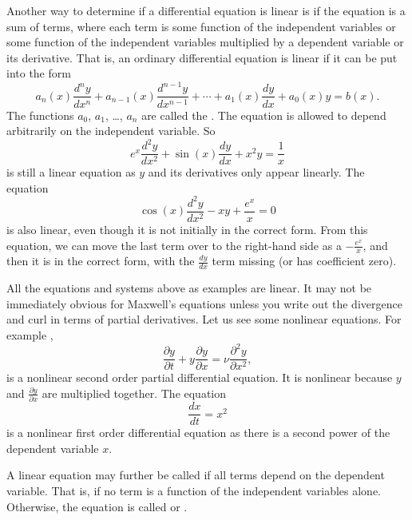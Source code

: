 Another way to determine if a differential equation is linear is if the equation is a sum of terms,
where each term is
some function of the independent variables
or 
some function of the independent variables
multiplied by a dependent variable
or its derivative. That is,
an ordinary differential equation is linear if it can be
put into the form
\begin{equation} \label{classification:eqlingen}
a_n(x) \frac{d^n y}{dx^n} + 
a_{n-1}(x) \frac{d^{n-1} y}{dx^{n-1}} + 
\cdots
+
a_{1}(x) \frac{dy}{dx}
+
a_{0}(x) y = b(x) .
\end{equation}
The functions $a_0$, $a_1$, \ldots, $a_n$ are called the
\emph{}.
The equation is allowed to depend arbitrarily on the independent variable.
So 
\begin{equation} \label{classification:eqlinex}
e^x \frac{d^2 y}{dx^2} + 
\sin(x) \frac{d y}{dx} + 
x^2 y
=
\frac{1}{x}
\end{equation}
is still a linear equation as $y$ and its derivatives only appear linearly. The equation
\[ \cos(x) \frac{d^2y}{dx^2} - xy + \frac{e^x}{x} = 0 \] is also linear, even though it
is not initially in the correct form. From this equation, we can move the last term over to the right-hand
side as a $-\frac{e^x}{x}$, and then it is in the correct form, with the $\frac{dy}{dx}$ term missing (or has coefficient zero).

All the equations and systems above as examples are linear.  
It may not be immediately obvious for Maxwell's equations unless you write out
the divergence and curl in terms of partial derivatives.  Let us see some
nonlinear equations.  For example ,
\begin{equation*}
\frac{\partial y}{\partial t} + 
y \frac{\partial y}{\partial x} =
\nu \frac{\partial^2 y}{\partial x^2} ,
\end{equation*}
is a nonlinear second order partial differential equation.  It is nonlinear
because $y$ and $\frac{\partial y}{\partial x}$ are multiplied together.
The equation
\begin{equation} \label{classification:eqnonlinode}
\frac{dx}{dt} = x^2
\end{equation}
is a nonlinear first order differential equation as there is a second power of
the dependent variable $x$.

\medskip

\begin{definition}
A linear equation may further be called \emph{} if
all terms depend on the dependent variable.  That is, if no
term is a function of the independent variables alone.  Otherwise, the
equation is called \emph{} or
\emph{}.
\end{definition}

